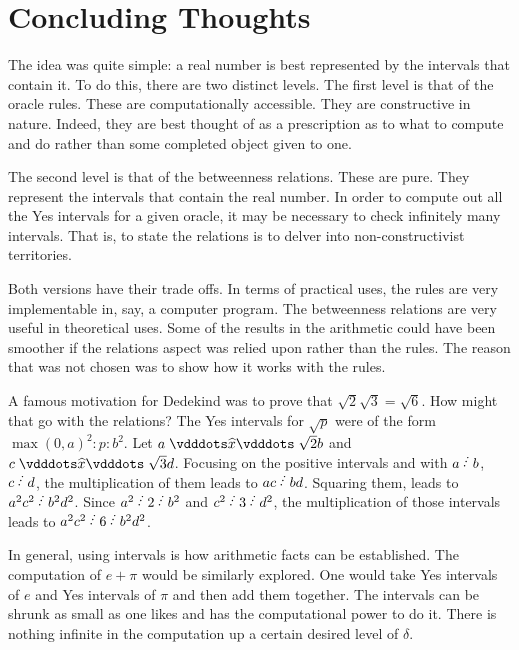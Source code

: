 \documentclass[12pt]{article}
\begin{document}
\section{Concluding Thoughts}

The idea was quite simple: a real number is best represented by the intervals that contain it. To do this, there are two distinct levels. The first level is that of the oracle rules. These are computationally accessible. They are constructive in nature. Indeed, they are best thought of as a prescription as to what to compute and do rather than some completed object given to one. 

The second level is that of the betweenness relations. These are pure. They represent the intervals that contain the real number. In order to compute out all the Yes intervals for a given oracle, it may be necessary to check infinitely many intervals. That is, to state the relations is to delver into non-constructivist territories. 

Both versions have their trade offs. In terms of practical uses, the rules are very implementable in, say, a computer program. The betweenness relations are very useful in theoretical uses. Some of the results in the arithmetic could have been smoother if the relations aspect was relied upon rather than the rules. The reason that was not chosen was to show how it works with the rules. 

A famous motivation for Dedekind was to prove that $\sqrt{2} \sqrt{3} = \sqrt{6}$. How might that go with the relations? The Yes intervals for $\sqrt{p}$ were of the form $\max(0,a)^2 : p : b^2$. Let $a \xora{\sqrt{2}} b$ and $c \xora{\sqrt{3}} d$. Focusing on the positive intervals and with $a\lte b$, $c \lte d$, the multiplication of them leads to $ac \lte bd$. Squaring them, leads to $a^2 c^2 \lte b^2 d^2$. Since $a^2 \lte 2 \lte b^2$ and $c^2 \lte 3 \lte d^2$, the multiplication of those intervals leads to $a^2 c^2 \lte 6 \lte b^2 d^2$.

In general, using intervals is how arithmetic facts can be established. The computation of $e + \pi$ would be similarly explored. One would take Yes intervals of $e$ and Yes intervals of $\pi$ and then add them together. The intervals can be shrunk as small as one likes and has the computational power to do it. There is nothing infinite in the computation up a certain desired level of $\delta$. 



\medskip

\normalem %

\printbibliography
\end{document}
